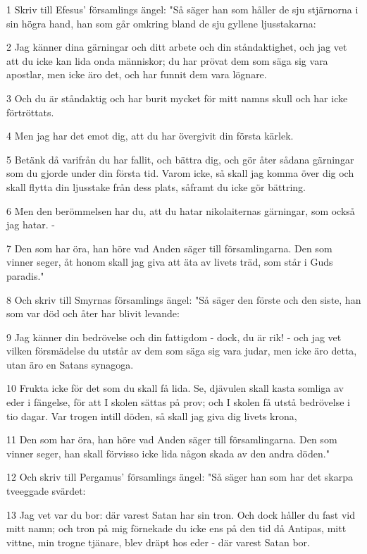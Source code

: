 \par 1 Skriv till Efesus' församlings ängel: "Så säger han som håller de sju stjärnorna i sin högra hand, han som går omkring bland de sju gyllene ljusstakarna:
\par 2 Jag känner dina gärningar och ditt arbete och din ståndaktighet, och jag vet att du icke kan lida onda människor; du har prövat dem som säga sig vara apostlar, men icke äro det, och har funnit dem vara lögnare.
\par 3 Och du är ståndaktig och har burit mycket för mitt namns skull och har icke förtröttats.
\par 4 Men jag har det emot dig, att du har övergivit din första kärlek.
\par 5 Betänk då varifrån du har fallit, och bättra dig, och gör åter sådana gärningar som du gjorde under din första tid. Varom icke, så skall jag komma över dig och skall flytta din ljusstake från dess plats, såframt du icke gör bättring.
\par 6 Men den berömmelsen har du, att du hatar nikolaiternas gärningar, som också jag hatar. -
\par 7 Den som har öra, han höre vad Anden säger till församlingarna. Den som vinner seger, åt honom skall jag giva att äta av livets träd, som står i Guds paradis."
\par 8 Och skriv till Smyrnas församlings ängel: "Så säger den förste och den siste, han som var död och åter har blivit levande:
\par 9 Jag känner din bedrövelse och din fattigdom - dock, du är rik! - och jag vet vilken försmädelse du utstår av dem som säga sig vara judar, men icke äro detta, utan äro en Satans synagoga.
\par 10 Frukta icke för det som du skall få lida. Se, djävulen skall kasta somliga av eder i fängelse, för att I skolen sättas på prov; och I skolen få utstå bedrövelse i tio dagar. Var trogen intill döden, så skall jag giva dig livets krona,
\par 11 Den som har öra, han höre vad Anden säger till församlingarna. Den som vinner seger, han skall förvisso icke lida någon skada av den andra döden."
\par 12 Och skriv till Pergamus' församlings ängel: "Så säger han som har det skarpa tveeggade svärdet:
\par 13 Jag vet var du bor: där varest Satan har sin tron. Och dock håller du fast vid mitt namn; och tron på mig förnekade du icke ens på den tid då Antipas, mitt vittne, min trogne tjänare, blev dräpt hos eder - där varest Satan bor.
